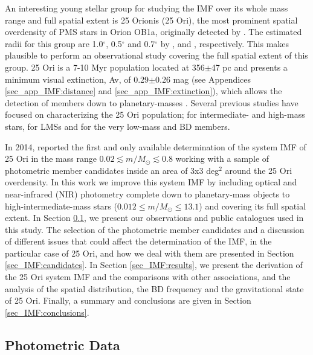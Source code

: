 \documentclass[12pt]{article}
\begin{document}
An interesting young stellar group for studying the IMF over its whole mass range and full spatial extent is 25 Orionis (\ac{25 Ori}), the most prominent spatial overdensity of PMS stars in Orion OB1a, originally detected by \citet{Briceno2005}. The estimated radii for this group are 1.0$^\circ$, 0.5$^\circ$ and 0.7$^\circ$ by \citet{Briceno2005,Briceno2007}, \citet{Downes2014} and \citet{Briceno2018}, respectively. This makes plausible to perform an observational study covering the full spatial extent of this group. 25 Ori is a 7-10 Myr population located at 356$\pm$47 pc and presents a minimum visual extinction, \ac{Av}, of 0.29$\pm$0.26 mag (see Appendices \ref{sec_app_IMF:distance} and \ref{sec_app_IMF:extinction}), which allows the detection of members down to planetary-masses \citep{Downes2015}. Several previous studies have focused on characterizing the 25 Ori population; \citet{Kharchenko2005,Kharchenko2013} for intermediate- and high-mass stars, \citet{Briceno2005,McGehee2006,Briceno2007,Hernandez2007a,Biazzo2011,Downes2014,Suarez2017,Briceno2018} for LMSs and \citet{Downes2014,Downes2015} for the very low-mass and BD members.

In 2014, \citeauthor{Downes2014} reported the first and only available determination of  the system IMF of 25 Ori in the mass range $0.02\lesssim m/M_\odot\lesssim 0.8$ working with a sample of photometric member candidates inside an area of 3x3 deg$^2$ around the 25 Ori overdensity. In this work we improve this system IMF by including optical and near-infrared (\ac{NIR}) photometry complete down to planetary-mass objects to high-intermediate-mass stars ($0.012\le m/M_\odot\le13.1$) and covering its full spatial extent. In Section \ref{sec_IMF:data}, we present our observations and public catalogues used in this study. The selection of the photometric member candidates and a discussion of different issues that could affect the determination of the IMF, in the particular case of 25 Ori, and how we deal with them are presented in Section \ref{sec_IMF:candidates}. In Section \ref{sec_IMF:results}, we present the derivation of the 25 Ori system IMF and the comparisons with other associations, and the analysis of the spatial distribution, the BD frequency and the gravitational state of 25 Ori. Finally, a summary and conclusions are given in Section \ref{sec_IMF:conclusions}.

\subsection{Photometric Data}
\label{sec_IMF:data}
\end{document}
